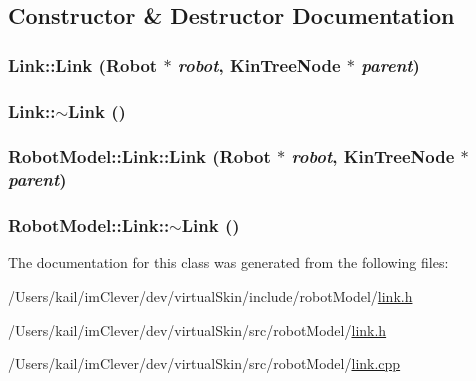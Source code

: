 \subsection{Constructor \& Destructor Documentation}
\hypertarget{class_robot_model_1_1_link_adf46ff7e38787594ac9941a478083f21}{
\subsubsection[{Link}]{\setlength{\rightskip}{0pt plus 5cm}Link::Link ({\bf Robot} $\ast$ {\em robot}, \/  {\bf KinTreeNode} $\ast$ {\em parent})}}
\label{class_robot_model_1_1_link_adf46ff7e38787594ac9941a478083f21}
\hypertarget{class_robot_model_1_1_link_a666e442abb3122fe5eb1705f1b2d650d}{
\subsubsection[{$\sim$Link}]{\setlength{\rightskip}{0pt plus 5cm}Link::$\sim$Link ()}}
\label{class_robot_model_1_1_link_a666e442abb3122fe5eb1705f1b2d650d}
\hypertarget{class_robot_model_1_1_link_a51f1c1b6b739dac1ecdff9e803db2499}{
\subsubsection[{Link}]{\setlength{\rightskip}{0pt plus 5cm}RobotModel::Link::Link ({\bf Robot} $\ast$ {\em robot}, \/  {\bf KinTreeNode} $\ast$ {\em parent})}}
\label{class_robot_model_1_1_link_a51f1c1b6b739dac1ecdff9e803db2499}
\hypertarget{class_robot_model_1_1_link_a8d7151624da1aa2dc7675ab63ec29a1c}{
\subsubsection[{$\sim$Link}]{\setlength{\rightskip}{0pt plus 5cm}RobotModel::Link::$\sim$Link ()}}
\label{class_robot_model_1_1_link_a8d7151624da1aa2dc7675ab63ec29a1c}


The documentation for this class was generated from the following files:\begin{DoxyCompactItemize}
\item 
/Users/kail/imClever/dev/virtualSkin/include/robotModel/\hyperlink{include_2robot_model_2link_8h}{link.h}\item 
/Users/kail/imClever/dev/virtualSkin/src/robotModel/\hyperlink{src_2robot_model_2link_8h}{link.h}\item 
/Users/kail/imClever/dev/virtualSkin/src/robotModel/\hyperlink{link_8cpp}{link.cpp}\end{DoxyCompactItemize}
